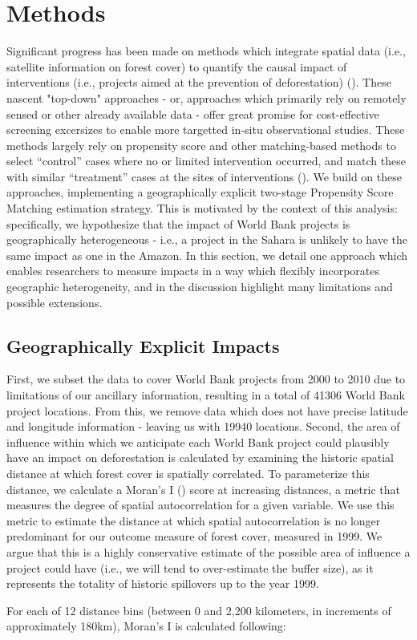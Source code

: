 \documentclass[sustainability,article,submit,moreauthors,pdftex,10pt,a4paper]{mdpi}
\begin{document}
\section{Methods}
Significant progress has been made on methods which integrate spatial data (i.e., satellite information on forest cover) to quantify the causal impact of interventions (i.e., projects aimed at the prevention of deforestation) (\cite{nelson_effectiveness_2011}). These nascent "top-down" approaches - or, approaches which primarily rely on remotely sensed or other already available data - offer great promise for cost-effective screening excersizes to enable more targetted in-situ observational studies.  These methods largely rely on propensity score and other matching-based methods to select ``control'' cases where no or limited intervention occurred, and match these with similar ``treatment'' cases at the sites of interventions (\cite{andam_measuring_2008}). We build on these approaches, implementing a geographically explicit two-stage Propensity Score Matching estimation strategy. This is motivated by the context of this analysis: specifically, we hypothesize that the impact of World Bank projects is geographically heterogeneous - i.e., a project in the Sahara is unlikely to have the same impact as one in the Amazon. In this section, we detail one approach which enables researchers to measure impacts in a way which flexibly incorporates geographic heterogeneity, and in the discussion highlight many limitations and possible extensions.

\subsection{Geographically Explicit Impacts}
First, we subset the data to cover World Bank projects from 2000 to 2010 due to limitations of our ancillary information, resulting in a total of 41306 World Bank project locations. From this, we remove data which does not have precise latitude and longitude information - leaving us with 19940 locations. Second, the area of influence within which we anticipate each World Bank project could plausibly have an impact on deforestation is calculated by examining the historic spatial distance at which forest cover is spatially correlated. To parameterize this distance, we calculate a Moran's I (\cite{getis_analysis_1992}) score at increasing distances, a metric that measures the degree of spatial autocorrelation for a given variable. We use this metric to estimate the distance at which spatial autocorrelation is no longer predominant for our outcome measure of forest cover, measured in 1999. We argue that this is a highly conservative estimate of the possible area of influence a project could have (i.e., we will tend to over-estimate the buffer size), as it represents the totality of historic spillovers up to the year 1999.
\par
For each of 12 distance bins (between 0 and 2,200 kilometers, in increments of approximately 180km), Moran's I is calculated following:
\end{document}
